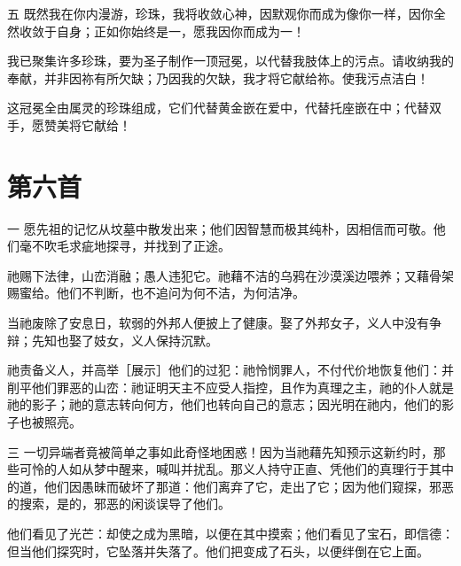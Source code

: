 五 既然我在你内漫游，珍珠，我将收敛心神，因默观你而成为像你一样，因你全然收敛于自身；正如你始终是一，愿我因你而成为一！\par

我已聚集许多珍珠，要为圣子制作一顶冠冕，以代替我肢体上的污点。请收纳我的奉献，并非因祢有所欠缺；乃因我的欠缺，我才将它献给祢。使我污点洁白！\par

这冠冕全由属灵的珍珠组成，它们代替黄金嵌在爱中，代替托座嵌在中；代替双手，愿赞美将它献给！\par


\section{第六首}

一 愿先祖的记忆从坟墓中散发出来；他们因智慧而极其纯朴，因相信而可敬。他们毫不吹毛求疵地探寻，并找到了正途。\par

祂赐下法律，山峦消融；愚人违犯它。祂藉不洁的乌鸦在沙漠溪边喂养；又藉骨架赐蜜给。他们不判断，也不追问为何不洁，为何洁净。\par

当祂废除了安息日，软弱的外邦人便披上了健康。娶了外邦女子，义人中没有争辩；先知也娶了妓女，义人保持沉默。\par

祂责备义人，并高举［展示］他们的过犯：祂怜悯罪人，不付代价地恢复他们：并削平他们罪恶的山峦：祂证明天主不应受人指控，且作为真理之主，祂的仆人就是祂的影子；祂的意志转向何方，他们也转向自己的意志；因光明在祂内，他们的影子也被照亮。\par

三 一切异端者竟被简单之事如此奇怪地困惑！因为当祂藉先知预示这新约时，那些可怜的人如从梦中醒来，喊叫并扰乱。那义人持守正直、凭他们的真理行于其中的道，他们因愚昧而破坏了那道：他们离弃了它，走出了它；因为他们窥探，邪恶的搜索，是的，邪恶的闲谈误导了他们。\par

他们看见了光芒：却使之成为黑暗，以便在其中摸索；他们看见了宝石，即信德：但当他们探究时，它坠落并失落了。他们把变成了石头，以便绊倒在它上面。\par

